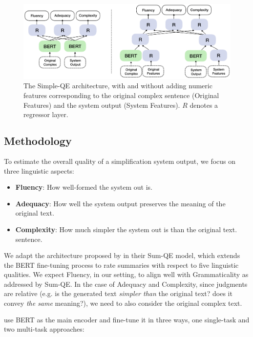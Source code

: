\documentclass[thesis.tex]{subfiles}
\begin{document}
\begin{figure}[bt]
    \centering
    \includegraphics[width=11.5cm]{pictures/simpleQE_architecture.jpg}
\caption{The Simple-QE architecture, with and without adding numeric features corresponding to the original complex sentence (Original Features) and the system output (System Features). $R$ denotes a regressor layer.}
\label{fig:simpleqe-arch}
\end{figure}

\subsection{Methodology} \label{sec:simpleqe-method}

To estimate the overall quality of a simplification system output, we focus on three linguistic aspects:

\begin{itemize}
    \item \textbf{Fluency}: How well-formed the system out is.
    \item \textbf{Adequacy}: How well the system output preserves the meaning of the original text.
    \item \textbf{Complexity}: How much 
    simpler the system out is than the original text. sentence.
\end{itemize} 

We adapt the architecture proposed by \cite{xenouleas2019sumqe} in their Sum-QE model, which extends the BERT fine-tuning process \citep{devlin2019bert} to rate summaries with respect to five linguistic qualities. We expect Fluency, in our setting, to align well with Grammaticality as addressed by Sum-QE. In the case of Adequacy and Complexity, since judgments are relative (e.g. is the generated text {\it simpler than} the original text? does it convey {\it the same} meaning?), we need to also consider the original complex text.

\cite{xenouleas2019sumqe} use BERT as the main encoder and fine-tune it in three ways, one single-task and two multi-task approaches:
\end{document}

